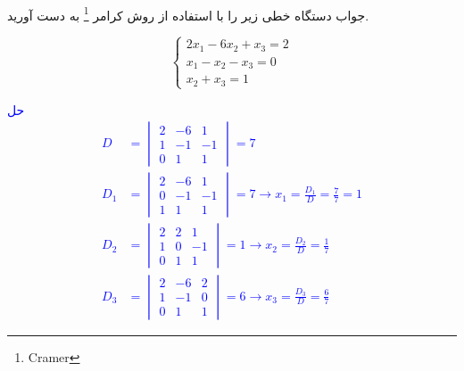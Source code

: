 \\
جواب دستگاه خطی زیر را با استفاده از روش کرامر
\footnote{Cramer}
 به دست آورید.
\\
\begin{center}
\[
    \begin{cases}
      2x_1 - 6x_2 + x_3 = 2\\
      x_1 - x_2 - x_3 = 0\\
      x_2 + x_3 = 1
    \end{cases}
\]
\end{center}

\textcolor{blue}{حل
\\
\begin{align*}
    D &= \begin{vmatrix}
     2 & -6 & 1\\ 
     1 & -1 & -1\\
     0 & 1 & 1 
\end{vmatrix}  = 7
 \\ 
 D_1 &= \begin{vmatrix}
     2 & -6 & 1\\ 
     0 & -1 & -1\\
     1 & 1 & 1 
\end{vmatrix} = 7 \rightarrow x_1 = \frac{D_1}{D} = \frac{7}{7} = 1 \\
D_2 &= \begin{vmatrix}
     2 & 2 & 1\\ 
     1 & 0 & -1\\
     0 & 1 & 1 
\end{vmatrix} = 1 \rightarrow x_2 = \frac{D_2}{D} = \frac{1}{7}
\\
D_3 &= \begin{vmatrix}
     2 & -6 & 2\\ 
     1 & -1 & 0\\
     0 & 1 & 1 
\end{vmatrix} = 6 \rightarrow x_3 = \frac{D_3}{D} = \frac{6}{7}
\end{align*}
}

